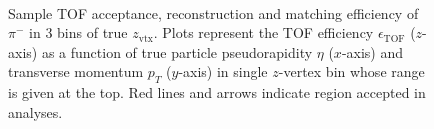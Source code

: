 \begin{figure}[H]
{\begin{subfigure}[b]{\linewidth}
		\end{subfigure}
	}%
	\quad%
	\parbox{0.485\textwidth}{
		\centering
		\begin{subfigure}[b]{\linewidth}\addtocounter{subfigure}{-2}
		\end{subfigure}\\[5pt]
		\begin{minipage}[t][0.78\linewidth][t]{\linewidth}\vspace{10pt}
			\caption[Sample plotz of TOF acceptance, reconstruction and matching efficiency of $\pi^{-}$.]{Sample TOF acceptance, reconstruction and matching efficiency of $\pi^{-}$ in 3 bins of true $z_{\text{vtx}}$. Plots represent the TOF efficiency $\epsilon_{\text{TOF}}$ ($z$-axis) as a function of true particle pseudorapidity $\eta$ ($x$-axis) and transverse momentum $p_{T}$ ($y$-axis) in single $z$-vertex bin whose range is given at the top. Red lines and arrows indicate region accepted in analyses.}\label{fig:tofEff_pion_sample}
		\end{minipage}
	}
	\vspace{-2cm}
\end{figure}



